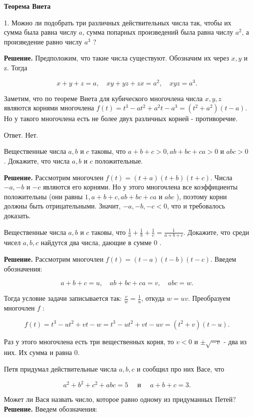 \centerline{\bf \Huge Теорема Виета}

1. Можно ли подобрать три различных действительных числа так, чтобы их сумма была равна числу $a$, сумма попарных произведений была равна числу $a^2$, а произведение равно числу $a^3$ ?

\textbf{Решение.} Предположим, что такие числа существуют. Обозначим их через $x, y$ и z. Тогда

$$
x+y+z=a, \quad x y+y z+z x=a^2, \quad x y z=a^3 .
$$


Заметим, что по теореме Виета для кубического многочлена числа $x, y, z$ являются корнями многочлена $f(t)=t^3-a t^2+a^2 t-a^3=\left(t^2+a^2\right)(t-a)$. Но у такого многочлена есть не более двух различных корней - противоречие.

Ответ. Нет.

Вещественные числа $a, b$ и $c$ таковы, что $a+b+c>0, a b+b c+c a>0$ и $a b c>0$. Докажите, что числа $a, b$ и $c$ положительные.

\textbf{Решение.} Рассмотрим многочлен $f(t)=(t+a)(t+b)(t+c)$. Числа $-a,-b$ и $-c$ являются его корнями. Но у этого многочлена все коэффициенты положительны (они равны $1, a+b+c, a b+b c+c a$ и $a b c$ ), поэтому корни должны быть отрицательными. Значит, $-a,-b,-c<0$, что и требовалось доказать.

Вещественные числа $a, b$ и $c$ таковы, что $\frac{1}{a}+\frac{1}{b}+\frac{1}{c}=\frac{1}{a+b+c}$. Докажите, что среди чисел $a, b, c$ найдутся два числа, дающие в сумме 0 .

\textbf{Решение.} Рассмотрим многочлен $f(t)=(t-a)(t-b)(t-c)$. Введем обозначения:

$$
a+b+c=u, \quad a b+b c+c a=v, \quad a b c=w .
$$


Тогда условие задачи записывается так: $\frac{v}{w}=\frac{1}{u}$, откуда $w=u v$. Преобразуем многочлен $f$ :

$$
f(t)=t^3-u t^2+v t-w=t^3-u t^2+v t-u v=\left(t^2+v\right)(t-u) .
$$


Раз у этого многочлена есть три вещественных корня, то $v<0$ и $\pm \sqrt{-v}$ - два из них. Их сумма и равна 0.

Петя придумал действительные числа $a, b, c$ и сообщил про них Васе, что

$$
a^2+b^2+c^2+a b c=5 \quad \text { и } \quad a+b+c=3 .
$$


Может ли Вася назвать число, которое равно одному из придуманных Петей?
\textbf{Решение.} Введем обозначения:


